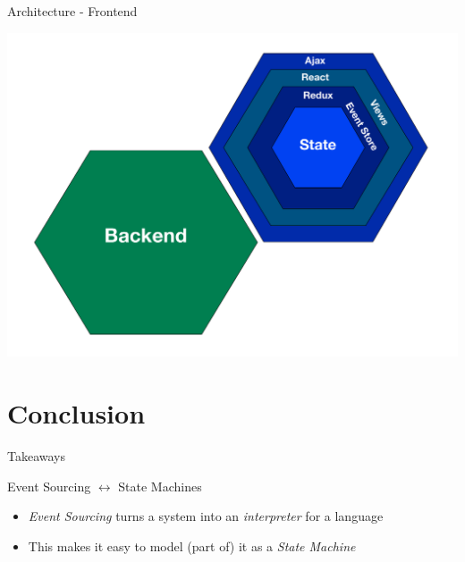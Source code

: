 \begin{frame}[fragile]{Architecture - Frontend}
  \begin{center}
    \includegraphics[height=.8\textheight]{./images/archi-front.pdf}
  \end{center}
\end{frame}

\part{Conclusion}

\begin{frame}[fragile]{Takeaways}
\end{frame}

\begin{frame}[fragile]{Event Sourcing $\leftrightarrow$ State Machines}
  \begin{itemize}[<+->]
  \item \emph{Event Sourcing} turns a system into an \emph{interpreter} for a language
  \item This makes it easy to model (part of) it as a \emph{State Machine}
  \end{itemize}
\end{frame}

